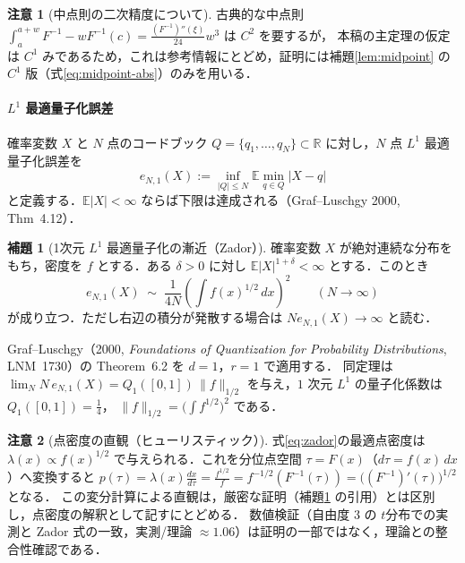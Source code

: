 \documentclass[a4paper,10pt]{jsarticle}
\makeatletter
\theoremstyle{definition}
\newtheorem{lemma}{補題}[section]
\newtheorem{remark}{注意}[section]
\renewenvironment{proof}[1][\proofname]{\par
  \pushQED{\qed}%
  \normalfont \topsep6\p@\@plus6\p@\relax
  \trivlist
  \item[\hskip\labelsep\textbf{#1}]\ignorespaces
}{%
  \popQED\endtrivlist\@endpefalse
}
\renewcommand{\proofname}{証明}
\newcommand{\Finv}{F^{-1}}
\newcommand{\R}{\mathbb{R}}
\newcommand{\E}{\mathbb{E}}
\newcommand{\eN}{e_{N,1}}
\makeatother
\begin{document}
\begin{remark}[中点則の二次精度について]
古典的な中点則 $\int_a^{a+w}\Finv-w\Finv(c)=\frac{(\Finv)''(\xi)}{24}w^3$ は $C^2$ を要するが，
本稿の主定理の仮定は $C^1$    みであるため，これは参考情報にとどめ，証明には補題\ref{lem:midpoint} の $C^1$ 版（式\eqref{eq:midpoint-abs}）のみを用いる．
\end{remark}

\paragraph{$L^1$ 最適量子化誤差}
確率変数 $X$ と $N$ 点のコードブック $Q=\{q_1,\dots,q_N\}\subset\R$ に対し，$N$ 点 $L^1$ 最適量子化誤差を
\begin{equation}
  \eN(X):=\inf_{|Q|\le N}\E\min_{q\in Q}|X-q|
  \label{eq:def-eN}
\end{equation}
と定義する．$\E|X|<\infty$ ならば下限は達成される（Graf--Luschgy 2000, Thm~4.12）．

\begin{lemma}[1次元 $L^1$ 最適量子化の漸近（Zador）]
\label{lem:zador}
確率変数 $X$ が絶対連続な分布をもち，密度を $f$ とする．ある $\delta>0$ に対し $\E|X|^{1+\delta}<\infty$ とする．このとき
\begin{equation}
  \eN(X)\;\sim\;\frac1{4N}\left(\int f(x)^{1/2}\,dx\right)^{2}
  \qquad(N\to\infty)
  \label{eq:zador}
\end{equation}
が成り立つ．ただし右辺の積分が発散する場合は $N\eN(X)\to\infty$ と読む．
\end{lemma}
\begin{proof}
Graf--Luschgy（2000, \textit{Foundations of Quantization for Probability Distributions}, LNM~1730）の Theorem~6.2 を $d=1$，$r=1$ で適用する．
同定理は $\lim_N N\,\eN(X)=Q_1([0,1])\,\|f\|_{1/2}$ を与え，$1$ 次元 $L^1$ の量子化係数は $Q_1([0,1])=\tfrac14$，
$\|f\|_{1/2}=\bigl(\int f^{1/2}\bigr)^2$ である．
\end{proof}

\begin{remark}[点密度の直観（ヒューリスティック）]
\label{rem:zador-heuristic}
式\eqref{eq:zador}の最適点密度は $\lambda(x)\propto f(x)^{1/2}$ で与えられる．これを分位点空間 $\tau=F(x)$（$d\tau=f(x)\,dx$）へ変換すると
$p(\tau)=\lambda(x)\frac{dx}{d\tau}=\frac{f^{1/2}}{f}=f^{-1/2}(\Finv(\tau))=\bigl((\Finv)'(\tau)\bigr)^{1/2}$ となる．
この変分計算による直観は，厳密な証明（補題\ref{lem:zador} の引用）とは区別し，点密度の解釈として記すにとどめる．
数値検証（自由度 $3$ の $t$分布での実測と Zador 式の一致，実測/理論 $\approx1.06$）は証明の一部ではなく，理論との整合性確認である．
\end{remark}
\end{document}
